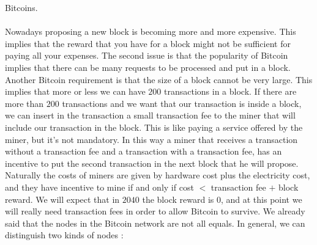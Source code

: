 Bitcoins.\\\\Nowadays proposing a new block is becoming more and more expensive. This implies that the reward that you have for a block might not be sufficient for paying all your expenses. The second issue is that the popularity of Bitcoin implies that there can be many requests to be processed and put in a block. Another Bitcoin requirement is that the size of a block cannot be very large. This implies that more or less we can have $200$ transactions in a block. If there are more than $200$ transactions and we want that our transaction is inside a block, we can insert in the transaction a small transaction fee to the miner that will include our transaction in the block. This is like paying a service offered by the miner, but it's not mandatory. In this way a miner that receives a transaction without a transaction fee and a transaction with a transaction fee, has an incentive to put the second transaction in the next block that he will propose. Naturally the costs of miners are given by hardware cost plus the electricity cost, and they have incentive to mine if and only if cost $<$ transaction fee $+$ block reward. We will expect that in $2040$ the block reward is $0$, and at this point we will really need transaction fees in order to allow Bitcoin to survive. We already said that the nodes in the Bitcoin network are not all equals. In general, we can distinguish two kinds of nodes :
